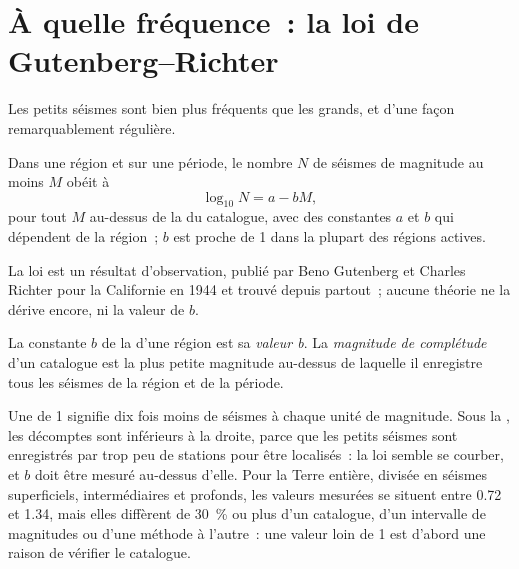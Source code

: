\section{À quelle fréquence~: la loi de Gutenberg--Richter}\label{sec:b1:earthquake-source:gr}

Les petits séismes sont bien plus fréquents que les grands, et d'une façon
remarquablement régulière.

\begin{proposition}\label{prop:b1:earthquake-source:gutenberg-richter}
Dans une région et sur une période, le nombre $N$ de séismes de magnitude au moins
$M$ obéit à
\[
  \log_{10} N = a - bM ,
\]
pour tout $M$ au-dessus de la  du catalogue, avec des
constantes $a$ et $b$ qui dépendent de la région~; $b$ est proche de 1 dans la plupart des
régions actives.
\end{proposition}
\admitted

La loi est un résultat d'observation, publié par Beno Gutenberg et Charles
Richter pour la Californie en 1944 et trouvé depuis partout~; aucune théorie ne
la dérive encore, ni la valeur de $b$.

\begin{definition}\label{def:b1:earthquake-source:b-value}
La constante $b$ de la  d'une région est sa
\emph{valeur b}. La \emph{magnitude de
complétude} d'un catalogue est la plus petite
magnitude au-dessus de laquelle il enregistre tous les séismes de la région et de la période.
\end{definition}

Une  de 1 signifie dix fois moins de séismes à chaque unité de magnitude.
Sous la , les décomptes sont inférieurs à la droite, parce que
les petits séismes sont enregistrés par trop peu de stations pour être localisés~: la loi
semble se courber, et $b$ doit être mesuré au-dessus d'elle. Pour la Terre entière,
divisée en séismes superficiels, intermédiaires et profonds, les valeurs mesurées
se situent entre 0.72 et 1.34, mais elles diffèrent de \qty{30}{\percent} ou plus d'un
catalogue, d'un intervalle de magnitudes ou d'une méthode à l'autre~: une valeur loin de 1 est
d'abord une raison de vérifier le catalogue.

